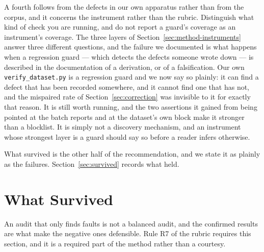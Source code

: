 \documentclass[sigconf,review]{acmart}
\begin{document}
A fourth follows from the defects in our own apparatus rather than from the
corpus, and it concerns the instrument rather than the rubric. Distinguish what
kind of check you are running, and do not report a guard's coverage as an
instrument's coverage. The three layers of
Section~\ref{sec:method-instruments} answer three different questions, and the
failure we documented is what happens when a regression guard --- which detects
the defects someone wrote down --- is described in the documentation of a
derivation, or of a falsification. Our own \texttt{verify\_dataset.py} is a
regression guard and we now say so plainly: it can find a defect that has been
recorded somewhere, and it cannot find one that has not, and the mispaired rate
of Section~\ref{sec:correction} was invisible to it for exactly that reason. It
is still worth running, and the two assertions it gained from being pointed at
the batch reports and at the dataset's own block make it stronger than a
blocklist. It is simply not a discovery mechanism, and an instrument whose
strongest layer is a guard should say so before a reader infers otherwise.

What survived is the other half of the recommendation, and we state it as
plainly as the failures. Section~\ref{sec:survived} records what held.

\section*{What Survived}
\label{sec:survived}

An audit that only finds faults is not a balanced audit, and the confirmed
results are what make the negative ones defensible. Rule R7 of the rubric
requires this section, and it is a required part of the method rather than a
courtesy.
\end{document}
